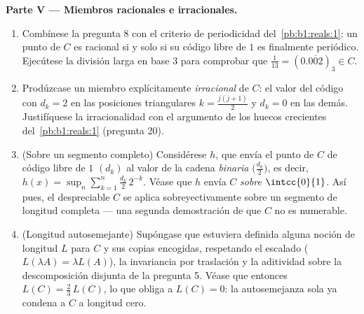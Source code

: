 \begin{problem}[{Problema del fin de semana --- el \omterm{pb:b1:topology:1}{conjunto de Cantor}
de los tercios centrales: longitud cero, no numerable, perfecto y
$C + C = \intcc{0}{2}$}]
\medskip
\noindent\textbf{Parte V --- Miembros racionales e irracionales.}
\begin{enumerate}[resume]
  \item Combínese la pregunta 8 con el criterio de periodicidad
        del~\cref{pb:b1:reals:1}: un punto de $C$ es racional si y
        solo si su código libre de $1$ es finalmente periódico.
        Ejecútese la división larga en base $3$ para comprobar que
        $\frac1{13} = (0.\overline{002})_3 \in C$.
  \item Prodúzcase un miembro explícitamente \emph{irracional} de $C$:
        el valor del código con $d_k = 2$ en las posiciones
        triangulares $k = \frac{j(j+1)}{2}$ y $d_k = 0$ en las demás.
        Justifíquese la irracionalidad con el argumento de los huecos
        crecientes del~\cref{pb:b1:reals:1} (pregunta 20).
  \item (Sobre un segmento completo) Considérese $h$, que envía el
        punto de $C$ de código libre de $1$ $(d_k)$ al valor de la
        cadena \emph{binaria} $\bigl(\frac{d_k}2\bigr)$, es decir,
        $h(x) = \sup_n \sum_{k=1}^n \frac{d_k}{2}\,2^{-k}$. Véase que
        $h$ envía $C$ \emph{sobre} $\intcc{0}{1}$. Así pues, el
        despreciable $C$ se aplica sobreyectivamente sobre un segmento
        de longitud completa --- una segunda demostración de que $C$
        no es numerable.
  \item (Longitud autosemejante) Supóngase que estuviera definida
        alguna noción de longitud $L$ para $C$ y sus copias
        encogidas, respetando el escalado ($L(\lambda A) = \lambda
        L(A)$), la invariancia por traslación y la aditividad sobre la
        descomposición disjunta de la pregunta 5. Véase que entonces
        $L(C) = \frac23\,L(C)$, lo que obliga a $L(C) = 0$: la
        autosemejanza sola ya condena a $C$ a longitud cero.
\end{enumerate}


\end{problem}
